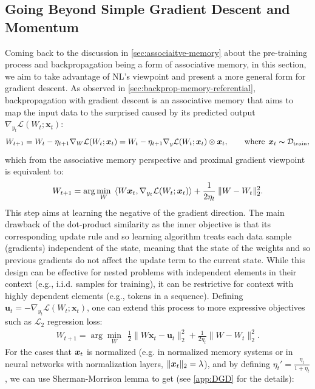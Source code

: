 {\subsection{Going Beyond Simple Gradient Descent and Momentum} \label{sec:L2-backprop}
Coming back to the discussion in \autoref{sec:associaitve-memory} about the pre-training process and backpropagation being a form of associative memory, in this section, we aim to take advantage of NL's viewpoint and present a more general form for gradient descent. As observed in \autoref{sec:backprop-memory-referential}, backpropagation with gradient descent is an associative memory that aims to map the input data to the surprised caused by its predicted output $\nabla_{y_t} \mathcal{L}(W_t;\boldsymbol{x}_t)$:
\begin{align}\label{eq:gradient-dual-2}
    W_{t+1} = W_{t} - \eta_{t+1} \nabla_{W} \mathcal{L}(W_t;\boldsymbol{x}_t) = W_{t} - \eta_{t+1} \nabla_{y} \mathcal{L}(W_t;\boldsymbol{x}_t) \otimes\boldsymbol{x}_t, \qquad \text{where}\:\:\boldsymbol{x}_t \thicksim \mathcal{D}_{\text{train}},
\end{align}
which from the associative memory perspective and proximal gradient viewpoint is equivalent to: 
\begin{align}
    W_{t+1} = \arg\min_{W} \:\: \langle W\boldsymbol{x}_t, \nabla_{y_t} \mathcal{L}(W_t;\boldsymbol{x}_t) \rangle + \frac{1}{2\eta_t} \: \|W - W_{t}\|^{2}_2.
\end{align}
This step aims at learning the negative of the gradient direction. The main drawback of the dot-product similarity as the inner objective is that its corresponding update rule and so learning algorithm treats each data sample (gradients) independent of the state, meaning that the state of the weights and so previous gradients do not affect the update term to the current state. While this design can be effective for nested problems with independent elements in their context (e.g., i.i.d. samples for training), it can be  restrictive for context with highly dependent elements (e.g., tokens in a sequence).  Defining $\mathbf{u}_t = -\nabla_{y_t} \mathcal{L}(W_t;\boldsymbol{x}_t)$, one can extend this process to more expressive objectives such as $\mathcal{L}_2$ regression loss:
\begin{align}
    W_{t+1} = \arg\min_{W} \:\: \frac{1}{2}\|W\boldsymbol{x}_t - \mathbf{u}_t \|^{2}_2 +  \frac{1}{2\eta_t}\|W - W_{t}\|^{2}_2.
\end{align}
For the cases that $\boldsymbol{x}_t$ is normalized (e.g.  in normalized memory systems or in neural networks with normalization layers, $\|\boldsymbol{x}_t\|_2 = \lambda$), and by defining $\eta_t' = \frac{\eta_t}{1+\eta_t}$, we can use Sherman-Morrison lemma to get (see \autoref{app:DGD} for the details):
}
